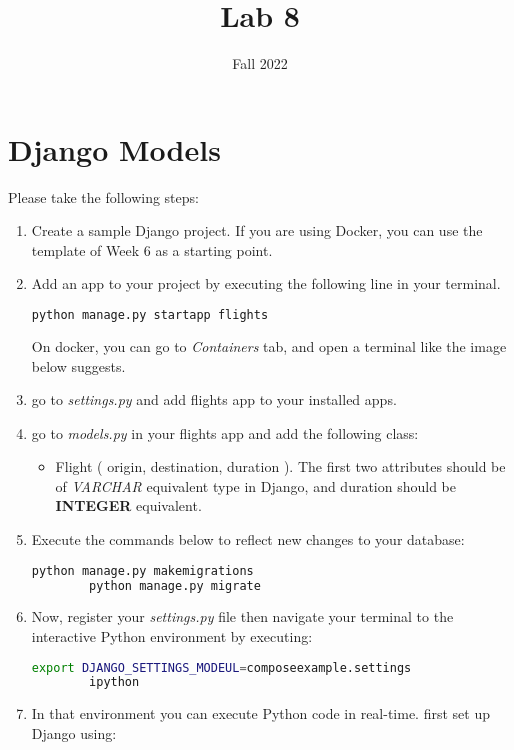 \documentclass{homework}
\author{}
\date{Fall 2022}
\title{Lab 8}
\begin{document}
 \maketitle

\section*{Django Models}
Please take the following steps:
\begin{enumerate}[label=\roman*)]
    \item Create a sample Django project. If you are using Docker, you can use the template of Week 6 as a starting point.
    \item Add an app to your project by executing the following line in your terminal.
    \begin{lstlisting}[language=bash]
        python manage.py startapp flights
\end{lstlisting}
    On docker, you can go to \textit{Containers} tab, and open a terminal like the image below suggests.
    \item go to \textit{settings.py} and add flights app to your installed apps.
    \item go to \textit{models.py} in your flights app and add the following class:
    \begin{itemize}
        \item Flight ( origin, destination, duration ). The first two attributes should be of \textit{VARCHAR} equivalent type in Django, and duration should be \textbf{INTEGER} equivalent.
    \end{itemize}
    \item Execute the commands below to reflect new changes to your database:
    \begin{lstlisting}[language=bash]
        python manage.py makemigrations
        python manage.py migrate
\end{lstlisting}
    \newpage
    \item Now, register your \textit{settings.py} file then navigate your terminal to the interactive Python environment by executing:
    \begin{lstlisting}[language=bash]
        export DJANGO_SETTINGS_MODEUL=composeexample.settings
        ipython
\end{lstlisting}
    \item In that environment you can execute Python code in real-time. first set up Django using:

\end{enumerate}
\end{document}
